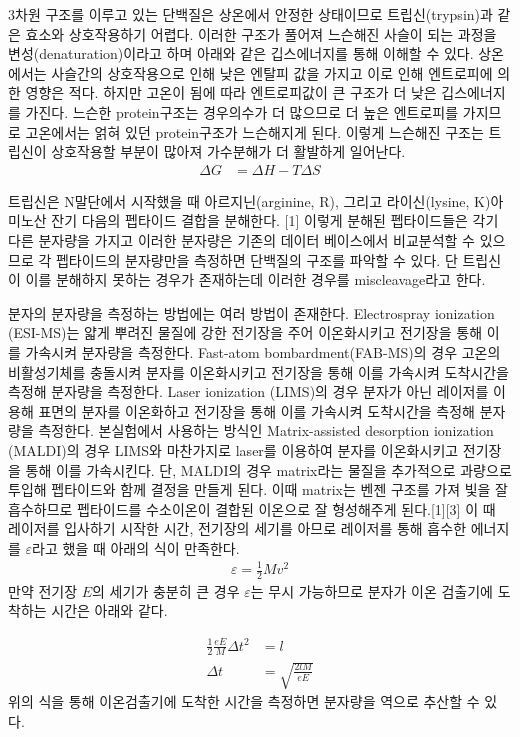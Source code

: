 \documentclass[%
 reprint,
 amsmath,amssymb,
 aps,
]{revtex4-2}
\begin{document}
3차원 구조를 이루고 있는 단백질은 상온에서 안정한 상태이므로 트립신(trypsin)과 같은 효소와 상호작용하기 어렵다. 이러한 구조가 풀어져 느슨해진 사슬이 되는 과정을 변성(denaturation)이라고 하며 아래와 같은 깁스에너지를 통해 이해할 수 있다. 상온에서는 사슬간의 상호작용으로 인해 낮은 엔탈피 값을 가지고 이로 인해 엔트로피에 의한 영향은 적다. 하지만 고온이 됨에 따라 엔트로피값이 큰 구조가 더 낮은 깁스에너지를 가진다. 느슨한 protein구조는 경우의수가 더 많으므로 더 높은 엔트로피를 가지므로 고온에서는 얽혀 있던 protein구조가 느슨해지게 된다. 이렇게 느슨해진 구조는 트립신이 상호작용할 부분이 많아져 가수분해가 더 활발하게 일어난다.
\begin{align}
	\Delta G &= \Delta H - T \Delta S
\end{align}

트립신은 N말단에서 시작했을 때 아르지닌(arginine, R), 그리고 라이신(lysine, K)아미노산 잔기 다음의 펩타이드 결합을 분해한다. [1] 이렇게 분해된 펩타이드들은 각기 다른 분자량을 가지고 이러한 분자량은 기존의 데이터 베이스에서 비교분석할 수 있으므로 각 펩타이드의 분자량만을 측정하면 단백질의 구조를 파악할 수 있다. 단 트립신이 이를 분해하지 못하는 경우가 존재하는데 이러한 경우를 miscleavage라고 한다.

분자의 분자량을 측정하는 방법에는 여러 방법이 존재한다. Electrospray ionization (ESI-MS)는 얇게 뿌려진 물질에 강한 전기장을 주어 이온화시키고 전기장을 통해 이를 가속시켜 분자량을 측정한다. Fast-atom bombardment(FAB-MS)의 경우 고온의 비활성기체를 충돌시켜 분자를 이온화시키고 전기장을 통해 이를 가속시켜 도착시간을 측정해 분자량을 측정한다. Laser ionization (LIMS)의 경우 분자가 아닌 레이저를 이용해 표면의 분자를 이온화하고 전기장을 통해 이를 가속시켜 도착시간을 측정해 분자량을 측정한다. 본실험에서 사용하는 방식인 Matrix-assisted desorption ionization (MALDI)의 경우 LIMS와 마찬가지로 laser를 이용하여 분자를 이온화시키고 전기장을 통해 이를 가속시킨다. 단, MALDI의 경우 matrix라는 물질을 추가적으로 과량으로 투입해 펩타이드와 함께 결정을 만들게 된다. 이때 matrix는 벤젠 구조를 가져 빛을 잘흡수하므로 펩타이드를 수소이온이 결합된 이온으로 잘 형성해주게 된다.[1][3] 이 때 레이저를 입사하기 시작한 시간, 전기장의 세기를 아므로 레이저를 통해 흡수한 에너지를 $\varepsilon$라고 했을 때 아래의 식이 만족한다.
\begin{align}
	\varepsilon = \frac{1}{2}Mv^{2}
\end{align}
만약 전기장 $E$의 세기가 충분히 큰 경우  $\varepsilon$는 무시 가능하므로 분자가 이온 검출기에 도착하는 시간은 아래와 같다.

\begin{align}
	\frac{1}{2}\frac{eE}{M}\Delta t^{2} &= l\\
	\Delta t &= \sqrt{\frac{2lM}{eE}}
\end{align}
위의 식을 통해 이온검출기에 도착한 시간을 측정하면 분자량을 역으로 추산할 수 있다.
\end{document}
